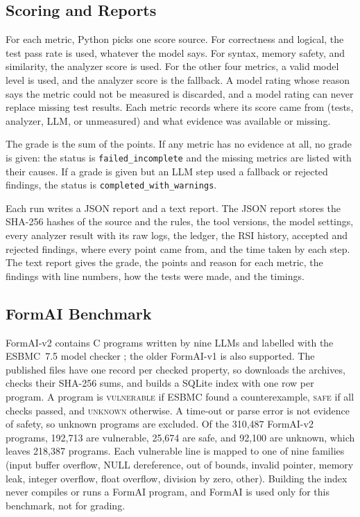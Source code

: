 \documentclass[conference]{IEEEtran}
\begin{document}
\subsection{Scoring and Reports}
For each metric, Python picks one score source. For correctness and logical, the
test pass rate is used, whatever the model says. For syntax, memory safety, and
similarity, the analyzer score is used. For the other four metrics, a valid model
level is used, and the analyzer score is the fallback. A model rating whose
reason says the metric could not be measured is discarded, and a model rating
can never replace missing test results. Each metric records where its score came
from (tests, analyzer, LLM, or unmeasured) and what evidence was available or
missing.

The grade is the sum of the points. If any metric has no evidence at all, no
grade is given: the status is \texttt{failed\_incomplete} and the missing metrics
are listed with their causes. If a grade is given but an LLM step used a fallback
or rejected findings, the status is \texttt{completed\_with\_warnings}.

Each run writes a JSON report and a text report. The JSON report stores the
SHA-256 hashes of the source and the rules, the tool versions, the model
settings, every analyzer result with its raw logs, the ledger, the RSI history,
accepted and rejected findings, where every point came from, and the time taken
by each step. The text report gives the grade, the points and reason for each
metric, the findings with line numbers, how the tests were made, and the
timings.

\subsection{FormAI Benchmark}
FormAI-v2 \cite{formai,formaiv2,formairepo} contains C programs written by nine
LLMs and labelled with the ESBMC~7.5 model checker \cite{esbmc}; the older
FormAI-v1 is also supported. The published files have one record per checked
property, so  downloads the archives, checks their
SHA-256 sums, and builds a SQLite index with one row per program. A program is
\textsc{vulnerable} if ESBMC found a counterexample, \textsc{safe} if all checks
passed, and \textsc{unknown} otherwise. A time-out or parse error is not
evidence of safety, so unknown programs are excluded. Of the 310,487 FormAI-v2
programs, 192,713 are vulnerable, 25,674 are safe, and 92,100 are unknown, which
leaves 218,387 programs. Each vulnerable line is mapped to one of nine families
(input buffer overflow, NULL dereference, out of bounds, invalid pointer, memory
leak, integer overflow, float overflow, division by zero, other). Building the
index never compiles or runs a FormAI program, and FormAI is used only for this
benchmark, not for grading.
\end{document}
